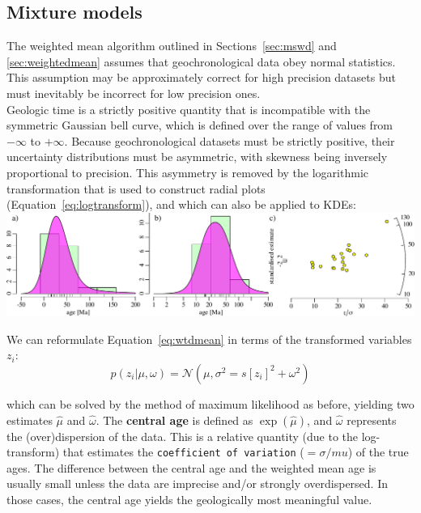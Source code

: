 \begin{refsection}
\section{Mixture models}
\label{sec:mixtures}

The weighted mean algorithm outlined in Sections~\ref{sec:mswd} and
\ref{sec:weightedmean} assumes that geochronological data obey normal
statistics. This assumption may be approximately correct for high
precision datasets but must inevitably be incorrect for low precision
ones.\\

Geologic time is a strictly positive quantity that is incompatible
with the symmetric Gaussian bell curve, which is defined over the
range of values from $-\infty$ to $+\infty$. Because geochronological
datasets must be strictly positive, their uncertainty distributions
must be asymmetric, with skewness being inversely proportional to
precision. This asymmetry is removed by the logarithmic transformation
that is used to construct radial plots
(Equation~\ref{eq:logtransform}), and which can also be applied to
KDEs:\\

\noindent\includegraphics[width=\textwidth]{../figures/logtrans.pdf}
\begingroup
{}
\endgroup

We can reformulate Equation~\ref{eq:wtdmean} in terms of the
transformed variables $z_i$:
\begin{equation}
  p(z_i|\mu,\omega) = \mathcal{N}\left( \mu, \sigma^2 =
  s[z_i]^2+\omega^2 \right)
  \label{eq:central}
\end{equation}

\noindent which can be solved by the method of maximum likelihood as
before, yielding two estimates $\hat{\mu}$ and $\hat{\omega}$. The
\textbf{central age} is defined as $\exp(\hat{\mu})$, and
$\hat{\omega}$ represents the (over)dispersion of the data.  This is a
relative quantity (due to the log-transform) that estimates the
\texttt{coefficient of variation} ($=\sigma/mu$) of the true ages. The
difference between the central age and the weighted mean age is
usually small unless the data are imprecise and/or strongly
overdispersed. In those cases, the central age yields the geologically
most meaningful value.\\


\end{refsection}
